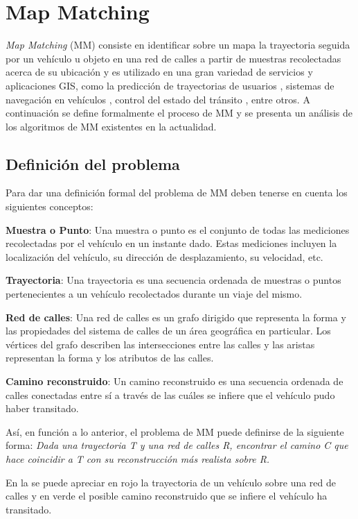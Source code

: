 \chapter{Map Matching}
\label{cap:4}

\emph{Map Matching} (MM) consiste en identificar sobre un mapa la trayectoria seguida por un vehículo u objeto en una red de calles a partir de muestras recolectadas acerca de su ubicación y es utilizado en una gran variedad de servicios y aplicaciones GIS, como la predicción de trayectorias de usuarios \cite{eisner2011algorithms}, sistemas de navegación en vehículos \cite{kim2001adaptive}, control del estado del tránsito \cite{thiagarajan2010cooperative, thiagarajan2009vtrack}, entre otros. A continuación se define formalmente el proceso de MM y se presenta un análisis de los algoritmos de MM existentes en la actualidad.

\section{Definición del problema}

Para dar una definición formal del problema de MM deben tenerse en cuenta los siguientes conceptos:

\textbf{Muestra o Punto}: Una muestra o punto es el conjunto de todas las mediciones recolectadas por el vehículo en un instante dado. Estas mediciones incluyen la localización del vehículo, su dirección de desplazamiento, su velocidad, etc.

\textbf{Trayectoria}: Una trayectoria es una secuencia ordenada de muestras o puntos pertenecientes a un vehículo recolectados durante un viaje del mismo.

\textbf{Red de calles}: Una red de calles es un grafo dirigido que representa la forma y las propiedades del sistema de calles de un área geográfica en particular. Los vértices del grafo describen las intersecciones entre las calles y las aristas representan la forma y los atributos de las calles.

\textbf{Camino reconstruido}: Un camino reconstruido es una secuencia ordenada de calles conectadas entre sí a través de las cuáles se infiere que el vehículo pudo haber transitado.

Así, en función a lo anterior, el problema de MM puede definirse de la siguiente forma: \emph{Dada una trayectoria T y una red de calles R, encontrar el camino C que hace coincidir a T con su reconstrucción más realista sobre R.}

En la  se puede apreciar en rojo la trayectoria de un vehículo sobre una red de calles y en verde el posible camino reconstruido que se infiere el vehículo ha transitado.

